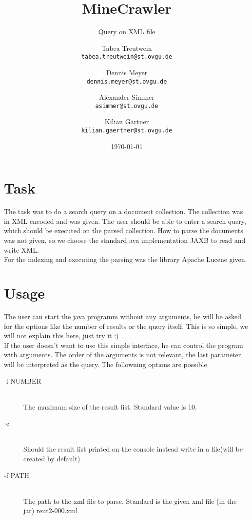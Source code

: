 \documentclass{scrartcl}
\title{MineCrawler}
\subtitle{Query on XML file}
\author{
  Tabea Treutwein\\
  \texttt{tabea.treutwein@st.ovgu.de}\\
  \and
  Dennis Meyer\\
  \texttt{dennis.meyer@st.ovgu.de}\\
  \and
  Alexander Simmer\\
  \texttt{asimmer@st.ovgu.de}\\
  \and
  Kilian Gärtner\\
  \texttt{kilian.gaertner@st.ovgu.de}\\
}
\date{\today}
\begin{document}
\maketitle
 
\section{Task}
The task was to do a search query on a document collection. The collection was in XML encoded and was given. The user should be able to enter a search query, which should be executed on the parsed collection. 
How to parse the documents was not given, so we choose the standard ava implementation JAXB to read and write XML. \\
For the indexing and executing the parsing was the library Apache Lucene given.


\section{Usage}
The user can start the java programm without any arguments, he will be asked for the options like the number of results or the query itself. This is so simple, we will not explain this here, just try it :) \\
If the user doesn't want to use this simple interface, he can control the program with arguments. The order of the arguments is not relevant, the last parameter will be interpreted as the query.
The followning options are possible

\begin{description}
  \item[-l NUMBER] \hfill \\
  The maximum size of the result list. Standard value is 10.
  \item[-c] \hfill \\
  Should the result list printed on the console instead write in a file(will be created by default)
  \item[-f PATH] \hfill \\
  The path to the xml file to parse. Standard is the given xml file (in the jar) reut2-000.xml
\end{description}
\end{document}
